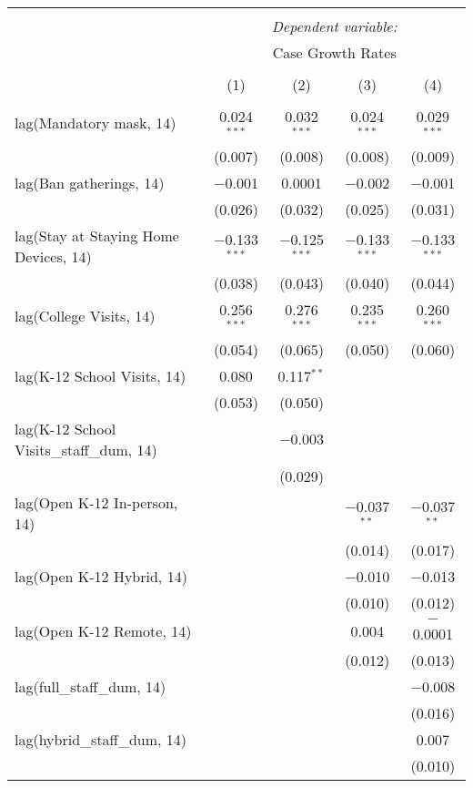 \begin{tabular}{@{\extracolsep{1pt}}lcccc} 
\\[-1.8ex]\hline 
\hline \\[-1.8ex] 
 & \multicolumn{4}{c}{\textit{Dependent variable:}} \\ 
\cline{2-5} 
 & \multicolumn{4}{c}{Case Growth Rates} \\ 
\\[-1.8ex] & (1) & (2) & (3) & (4)\\ 
\hline \\[-1.8ex] 
 lag(Mandatory mask, 14) & 0.024$^{***}$ & 0.032$^{***}$ & 0.024$^{***}$ & 0.029$^{***}$ \\ 
  & (0.007) & (0.008) & (0.008) & (0.009) \\ 
  lag(Ban gatherings, 14) & $-$0.001 & 0.0001 & $-$0.002 & $-$0.001 \\ 
  & (0.026) & (0.032) & (0.025) & (0.031) \\ 
  lag(Stay at Staying Home Devices, 14) & $-$0.133$^{***}$ & $-$0.125$^{***}$ & $-$0.133$^{***}$ & $-$0.133$^{***}$ \\ 
  & (0.038) & (0.043) & (0.040) & (0.044) \\ 
  lag(College Visits, 14) & 0.256$^{***}$ & 0.276$^{***}$ & 0.235$^{***}$ & 0.260$^{***}$ \\ 
  & (0.054) & (0.065) & (0.050) & (0.060) \\ 
  lag(K-12 School Visits, 14) & 0.080 & 0.117$^{**}$ &  &  \\ 
  & (0.053) & (0.050) &  &  \\ 
  lag(K-12 School Visits\_staff\_dum, 14) &  & $-$0.003 &  &  \\ 
  &  & (0.029) &  &  \\ 
  lag(Open K-12 In-person, 14) &  &  & $-$0.037$^{**}$ & $-$0.037$^{**}$ \\ 
  &  &  & (0.014) & (0.017) \\ 
  lag(Open K-12 Hybrid, 14) &  &  & $-$0.010 & $-$0.013 \\ 
  &  &  & (0.010) & (0.012) \\ 
  lag(Open K-12 Remote, 14) &  &  & 0.004 & $-$0.0001 \\ 
  &  &  & (0.012) & (0.013) \\ 
  lag(full\_staff\_dum, 14) &  &  &  & $-$0.008 \\ 
  &  &  &  & (0.016) \\ 
  lag(hybrid\_staff\_dum, 14) &  &  &  & 0.007 \\ 
  &  &  &  & (0.010) \\ 

\end{tabular}
